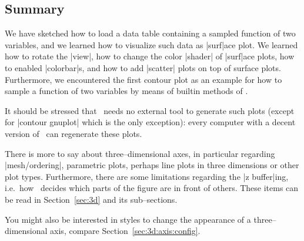 \subsection{Summary}
We have sketched how to load a data table containing a sampled function of two variables, and we learned how to visualize such data as |surf|ace plot. We learned how to rotate the |view|, how to change the color |shader| of |surf|ace plots, how to enabled |colorbar|s, and how to add |scatter| plots on top of surface plots. Furthermore, we encountered the first contour plot as an example for how to sample a function of two variables by means of builtin methods of \PGFPlots.

It should be stressed that \PGFPlots\ needs no external tool to generate such plots (except for |contour gnuplot| which is the only exception): every computer with a decent version of \PGFPlots\ can regenerate these plots.

There is more to say about three--dimensional axes, in particular regarding |mesh/ordering|, parametric plots, perhaps line plots in three dimensions or other plot types. Furthermore, there are some limitations regarding the |z buffer|ing, i.e.\ how \PGFPlots\ decides which parts of the figure are in front of others. These items can be read in Section~\ref{sec:3d} and its sub--sections. 

You might also be interested in styles to change the appearance of a three--dimensional axis, compare Section~\ref{sec:3d:axis:config}.



